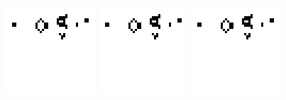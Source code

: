 \documentclass[a4paper,12pt,twoside]{article}
\begin{document}
\begin{figure}[htb]
\begin{center}
      \includegraphics[width=.75\textwidth]{test1.png}
      \includegraphics[width=.75\textwidth]{test1.png}
      \includegraphics[width=.75\textwidth]{test1.png}

\end{center}
\end{figure}
\end{document}
